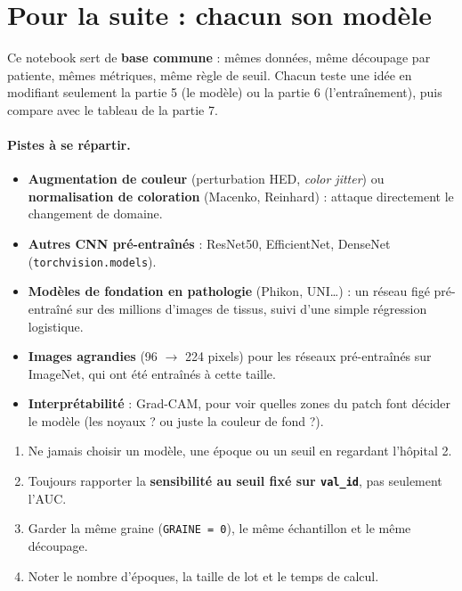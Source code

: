 \documentclass[11pt,a4paper]{article}
\begin{document}
\section{Pour la suite : chacun son modèle}
Ce notebook sert de \textbf{base commune} : mêmes données, même découpage par patiente, mêmes métriques, même
règle de seuil. Chacun teste une idée en modifiant seulement la partie 5 (le modèle) ou la partie 6
(l'entraînement), puis compare avec le tableau de la partie 7.

\paragraph{Pistes à se répartir.}
\begin{itemize}
  \item \textbf{Augmentation de couleur} (perturbation HED, \emph{color jitter}) ou \textbf{normalisation de
        coloration} (Macenko, Reinhard) : attaque directement le changement de domaine.
  \item \textbf{Autres CNN pré-entraînés} : ResNet50, EfficientNet, DenseNet (\texttt{torchvision.models}).
  \item \textbf{Modèles de fondation en pathologie} (Phikon, UNI…) : un réseau figé pré-entraîné sur des
        millions d'images de tissus, suivi d'une simple régression logistique.
  \item \textbf{Images agrandies} (96 $\to$ 224 pixels) pour les réseaux pré-entraînés sur ImageNet, qui ont
        été entraînés à cette taille.
  \item \textbf{Interprétabilité} : Grad-CAM, pour voir quelles zones du patch font décider le modèle (les
        noyaux ? ou juste la couleur de fond ?).
\end{itemize}

\begin{resume}
\begin{enumerate}
  \item Ne jamais choisir un modèle, une époque ou un seuil en regardant l'hôpital 2.
  \item Toujours rapporter la \textbf{sensibilité au seuil fixé sur \texttt{val\_id}}, pas seulement l'AUC.
  \item Garder la même graine (\texttt{GRAINE = 0}), le même échantillon et le même découpage.
  \item Noter le nombre d'époques, la taille de lot et le temps de calcul.
\end{enumerate}
\end{resume}
\end{document}
